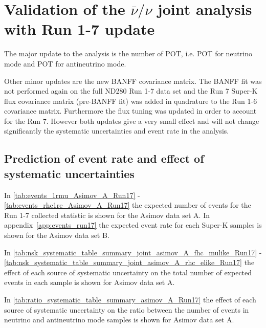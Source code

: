 \clearpage


\section{Validation of the $\bar{\nu}/\nu$ joint analysis with Run 1-7 update}
\label{sec:validation_run17}

The major update to the analysis is the number of POT, 
i.e. 
\TotalPotNuRunOneSeven{} POT for neutrino mode
and
\TotalPotNuBarRunOneSeven{} POT for antineutrino mode. 

Other minor updates are the new BANFF covariance matrix.
The BANFF fit was not performed again on the full ND280 Run 1-7 data set
and the Run 7 Super-K flux covariance matrix (pre-BANFF fit) was added in quadrature
to the Run 1-6 covariance matrix.
Furthermore the flux tuning was updated in order to account for the Run 7.
However both updates give a very small effect and will not change significantly the systematic
uncertainties and event rate in the analysis.

%
%

\subsection{Prediction of event rate and effect of systematic uncertainties}
\label{sec:event_rate_syst_run17}




In \cref{tab:events_1rmu_Asimov_A_Run17} - \ref{tab:events_rhc1re_Asimov_A_Run17} 
the expected number of events for the Run 1-7 collected statistic is shown for the Asimov data set A.
In appendix~\ref{app:events_run17} the expected event rate for each Super-K samples is shown for the Asimov data set B.






\clearpage

In \cref{tab:nsk_systematic_table_summary_joint_asimov_A_fhc_mulike_Run17} - 
\ref{tab:nsk_systematic_table_summary_joint_asimov_A_rhc_elike_Run17}
the effect of each source of systematic uncertainty on the total number of expected events in each sample is shown
for Asimov data set A.

In \cref{tab:ratio_systematic_table_summary_asimov_A_Run17} 
the effect of each source of systematic uncertainty on the ratio between the number of events in 
neutrino and antineutrino mode samples is shown for Asimov data set A.

